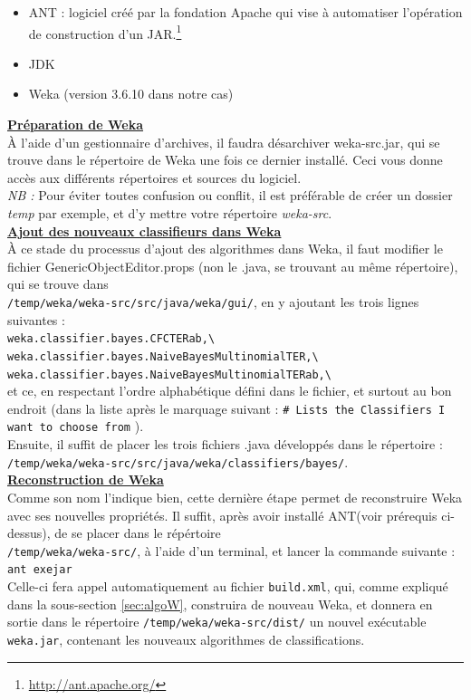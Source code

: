 \documentclass{article}
\begin{document}
\begin{itemize}
\item ANT : logiciel créé par la fondation Apache qui vise à automatiser l'opération de construction d'un JAR.\footnote{\href{http://ant.apache.org/}{http://ant.apache.org/}}
\item JDK
\item Weka (version 3.6.10 dans notre cas)
\end{itemize}
\textbf{\underline{Préparation de Weka}}\\
À l'aide d'un gestionnaire d'archives, il faudra désarchiver weka-src.jar, qui se trouve dans le répertoire de Weka une fois ce dernier installé. Ceci vous donne accès aux différents répertoires et sources du logiciel.\\
\textit{NB :} Pour éviter toutes confusion ou conflit, il est préférable de créer un dossier \textit{temp} par exemple, et d'y mettre votre répertoire \textit{weka-src}.\\
\textbf{\underline{Ajout des nouveaux classifieurs dans Weka}}\\
À ce stade du processus d'ajout des algorithmes dans Weka, il faut modifier le fichier GenericObjectEditor.props (non le .java, se trouvant au même répertoire), qui se trouve dans \\
 \texttt{/temp/weka/weka-src/src/java/weka/gui/}, en y ajoutant les trois lignes suivantes : \\
 \texttt{weka.classifier.bayes.CFCTERab,\textbackslash}\\
 \texttt{weka.classifier.bayes.NaiveBayesMultinomialTER,\textbackslash}\\
 \texttt{weka.classifier.bayes.NaiveBayesMultinomialTERab,\textbackslash}\\
 et ce, en respectant l'ordre alphabétique défini dans le fichier, et surtout au bon endroit (dans la liste après le marquage suivant :  \texttt{\# Lists the Classifiers I want to choose from} ).\\
Ensuite, il suffit de placer les trois fichiers .java développés dans le répertoire :\\
 \texttt{/temp/weka/weka-src/src/java/weka/classifiers/bayes/}.\\
 \textbf{\underline{Reconstruction de Weka}}\\
 Comme son nom l'indique bien, cette dernière étape permet de reconstruire Weka avec ses nouvelles propriétés. Il suffit, après avoir installé ANT(voir prérequis ci-dessus), de se placer dans le répértoire \\
  \texttt{/temp/weka/weka-src/}, à l'aide d'un terminal, et lancer la commande suivante : \\
\texttt{ant exejar}\\
Celle-ci fera appel automatiquement au fichier \texttt{build.xml}, qui, comme expliqué dans la sous-section \ref{sec:algoW}, construira de nouveau Weka, et donnera en sortie dans le répertoire \texttt{/temp/weka/weka-src/dist/} un nouvel exécutable \texttt{weka.jar}, contenant les nouveaux algorithmes de classifications.
\end{document}
